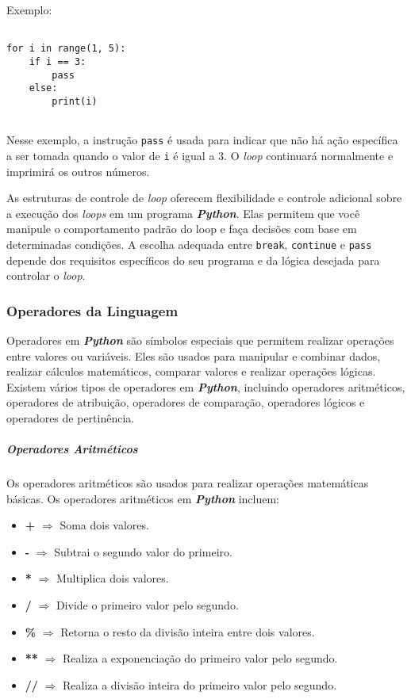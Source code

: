 \documentclass[a4paper, 12pt, onecolumn,singlespacing]{article}
\begin{document}
	Exemplo:
	
	\begin{verbatim}
		
for i in range(1, 5):
	if i == 3:
		pass
	else:
		print(i)
	
	\end{verbatim}
	\label{clausula_pass}

Nesse exemplo, a instrução \texttt{pass} é usada para indicar que não há ação específica a ser tomada quando o valor de \texttt{i} é igual a 3. O \textit{loop} continuará normalmente e imprimirá os outros números.

As estruturas de controle de \textit{loop} oferecem flexibilidade e controle adicional sobre a execução dos \textit{loops} em um programa \textbf{\textit{Python}}. Elas permitem que você manipule o comportamento padrão do loop e faça decisões com base em determinadas condições. A escolha adequada entre \texttt{break}, \texttt{continue} e \texttt{pass} depende dos requisitos específicos do seu programa e da lógica desejada para controlar o \textit{loop}.
	
	\subsubsection{Operadores da Linguagem}
	\label{operadores_da_linguagem}
	
Operadores em \textbf{\textit{Python}} são símbolos especiais que permitem realizar operações entre valores ou variáveis. Eles são usados para manipular e combinar dados, realizar cálculos matemáticos, comparar valores e realizar operações lógicas. Existem vários tipos de operadores em \textbf{\textit{Python}}, incluindo operadores aritméticos, operadores de atribuição, operadores de comparação, operadores lógicos e operadores de pertinência.

	\subparagraph{Operadores Aritméticos}
	\label{python_operadores_aritmeticos}
	Os operadores aritméticos são usados para realizar operações matemáticas básicas. Os operadores aritméticos em \textbf{\textit{Python}} incluem:
	
	\begin{itemize}
		\item \textbf{+} $\Rightarrow$ Soma dois valores.
		\item \textbf{-} $\Rightarrow$ Subtrai o segundo valor do primeiro.
		\item \textbf{*} $\Rightarrow$ Multiplica dois valores.
		\item \textbf{/} $\Rightarrow$ Divide o primeiro valor pelo segundo.
		\item \textbf{\%} $\Rightarrow$ Retorna o resto da divisão inteira entre dois valores.
		\item \textbf{**} $\Rightarrow$ Realiza a exponenciação do primeiro valor pelo segundo.
		\item \textbf{//} $\Rightarrow$ Realiza a divisão inteira do primeiro valor pelo segundo.
	\end{itemize}
\end{document}
